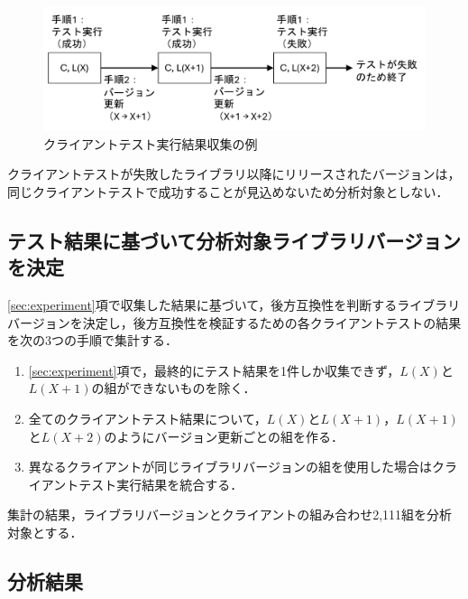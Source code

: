 \documentclass[submit]{ipsj}
\begin{document}
\begin{figure}[t]
  \centering
  \includegraphics[width=1\linewidth]{IPSJjournal_maekawa_fig/experiment-example1.pdf}
  \caption{クライアントテスト実行結果収集の例}
  \label{fig:experimentExample}
\end{figure}

クライアントテストが失敗したライブラリ以降にリリースされたバージョンは，同じクライアントテストで成功することが見込めないため分析対象としない．

\subsection{テスト結果に基づいて分析対象ライブラリバージョンを決定}

\ref{sec:experiment}項で収集した結果に基づいて，後方互換性を判断するライブラリバージョンを決定し，後方互換性を検証するための各クライアントテストの結果を次の3つの手順で集計する．
\begin{enumerate}
  \item \ref{sec:experiment}項で，最終的にテスト結果を1件しか収集できず，$L(X)$と$L(X+1)$の組ができないものを除く．
  \item 全てのクライアントテスト結果について，$L(X)$と$L(X+1)$，$L(X+1)$と$L(X+2)$のようにバージョン更新ごとの組を作る．
  \item 異なるクライアントが同じライブラリバージョンの組を使用した場合はクライアントテスト実行結果を統合する．
\end{enumerate}
集計の結果，ライブラリバージョンとクライアントの組み合わせ2,111組を分析対象とする．

\subsection{分析結果}

\end{document}
